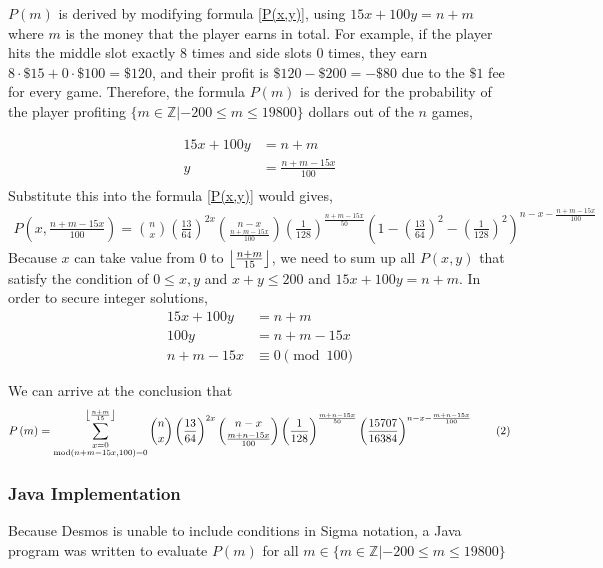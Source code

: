 \documentclass{article}
\begin{document}
$P(m)$ is derived by modifying formula \ref{P(x,y)}, using $15x+100y=n+m$ where $m$ is the money that the player earns in total. For example, if the player hits the middle slot exactly 8 times and side slots 0 times, they earn $8\cdot \$15+0\cdot \$100=\$120$, and their profit is $\$120-\$200=-\$80$ due to the $\$1$ fee for every game. Therefore, the formula $P(m)$ is derived for the probability of the player profiting $\{m\in\mathbb Z|-200\leq m\leq 19800\}$ dollars out of the $n$ games,

\begin{align*}
    15x+100y&=n+m\\
    y&=\frac{n+m-15x}{100}\\
\end{align*}
Substitute this into the formula \ref{P(x,y)} would gives,
\begin{align*}
    P\left(x,\frac{n+m-15x}{100}\right)={n\choose x}\left(\frac{13}{64}\right)^{2x}{n-x\choose \frac{n+m-15x}{100}}\left(\frac{1}{128}\right)^{\frac{n+m-15x}{50}}\left(1-\left(\frac{13}{64}\right)^{2}-\left(\frac{1}{128}\right)^{2}\right)^{n-x-\frac{n+m-15x}{100}}
\end{align*}
Because $x$ can take value from $0$ to $\left\lfloor \frac{n+m}{15} \right\rfloor$, we need to sum up all $P(x,y)$ that satisfy the condition of $0\leq x,y$ and $x+y\leq 200$ and $15x+100y=n+m$. In order to secure integer solutions, 
\begin{align*}
    15x+100y&=n+m\\
    100y&=n+m-15x\\
    n+m-15x&\equiv 0\pmod{100}
\end{align*}

We can arrive at the conclusion that 
\[P\left(m\right)=\sum_{\substack{x=0\\ \operatorname{mod}(n+m-15x,100)=0}}^{\left\lfloor \frac{n+m}{15} \right\rfloor}{n\choose x}\left(\frac{13}{64}\right)^{2x}{n-x\choose \frac{m+n-15x}{100}}\left(\frac{1}{128}\right)^{\frac{m+n-15x}{50}}\left(\frac{15707}{16384}\right)^{n-x-\frac{m+n-15x}{100}}\tag{2}\label{P(m)}\]

\subsubsection{Java Implementation}
Because Desmos is unable to include conditions in Sigma notation, a Java program was written to evaluate $P(m)$ for all $m\in\{m\in\mathbb{Z}|-200\leq m\leq 19800\}$
\end{document}
